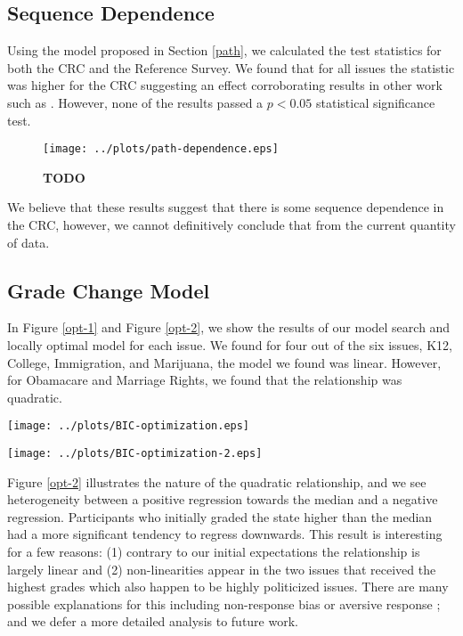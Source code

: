 \subsection{Sequence Dependence}
Using the model proposed in Section \ref{path}, we calculated the test statistics for both the CRC and the Reference Survey.
We found that for all issues the statistic was higher for the CRC suggesting an effect corroborating results in other work such as \cite{???}.
However, none of the results passed a $p < 0.05$ statistical significance test.
\begin{figure}[h!]
  \centering
    \texttt{[image: ../plots/path-dependence.eps]}
      \caption{\textbf{TODO}}
      \label{path-1}
\end{figure}
We believe that these results suggest that there is some sequence dependence in the CRC, however, we cannot definitively conclude that from the current quantity of data.

\subsection{Grade Change Model}
In Figure \ref{opt-1} and Figure \ref{opt-2}, we show the results of our model search and locally optimal model for each issue.
We found for four out of the six issues, K12, College, Immigration, and Marijuana, the model we found was linear.
However, for Obamacare and Marriage Rights, we found that the relationship was quadratic.

\begin{figure*}[h!]
  \centering
    \texttt{[image: ../plots/BIC-optimization.eps]}
      \caption{\textbf{TODO}}
      \label{opt-1}
\end{figure*}

\begin{figure*}[h!]
  \centering
    \texttt{[image: ../plots/BIC-optimization-2.eps]}
      \caption{\textbf{TODO}}
      \label{opt-2}
\end{figure*}

Figure \ref{opt-2} illustrates the nature of the quadratic relationship, and we see heterogeneity between a positive regression towards the median and a negative regression.
Participants who initially graded the state higher than the median had a more significant tendency to regress downwards.
This result is interesting for a few reasons: (1) contrary to our initial expectations the relationship is largely linear and (2) non-linearities appear in the two issues that received the highest grades which also happen to be highly politicized issues.
There are many possible explanations for this including non-response bias \cite{???} or aversive response \cite{???}; and we defer a more detailed analysis to future work.


